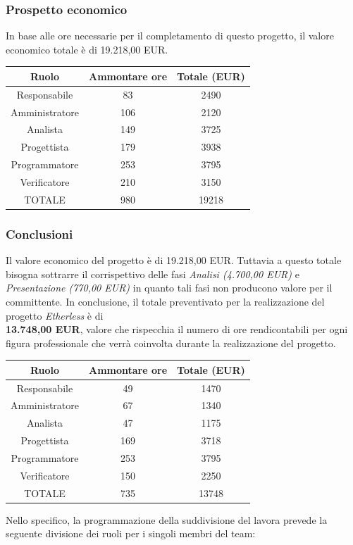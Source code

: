 \subsubsection{Prospetto economico}
In base alle ore necessarie per il completamento di questo progetto, il valore economico totale è di 19.218,00 EUR.
\begin{center}
\begin{tabular}{ |c|c|c|  }
 \hline
 Ruolo 		& Ammontare ore 	& Totale (EUR)\\
 \hline
 \hline
 	Responsabile	& 83 		& 2490\\
	Amministratore	& 106		& 2120\\
	Analista		& 149 		& 3725\\
	Progettista		& 179		& 3938\\
	Programmatore	& 253		& 3795\\
	Verificatore	& 210 		& 3150\\
 \hline\hline
 TOTALE		& 980		& 19218\\
  \hline
\end{tabular}
\end{center}

\subsubsection{Conclusioni}
Il valore economico del progetto è di 19.218,00 EUR. Tuttavia a questo totale bisogna sottrarre il corrispettivo delle fasi \textit{Analisi (4.700,00 EUR)} e \textit{Presentazione (770,00 EUR)} in quanto tali fasi non producono valore per il committente.
\newline
\newline
In conclusione, il totale preventivato per la realizzazione del progetto \textit{Etherless} è di\\ \textbf{13.748,00 EUR}, valore che rispecchia il numero di ore rendicontabili per ogni figura professionale che verrà coinvolta durante la realizzazione del progetto. 

\begin{center}
\begin{tabular}{ |c|c|c|  }
 \hline
 Ruolo 		& Ammontare ore 	& Totale (EUR)\\
 \hline
 \hline
 	Responsabile	& 49 	& 1470\\
	Amministratore	& 67		& 1340\\
	Analista		& 47 	& 1175\\
	Progettista		& 169	& 3718\\
	Programmatore	& 253	& 3795\\
	Verificatore	& 150 	& 2250\\
 \hline\hline
 TOTALE		& 735		& 13748\\
  \hline
\end{tabular}
\end{center}
Nello specifico, la programmazione della suddivisione del lavora prevede la seguente divisione dei ruoli per i singoli membri del team:

